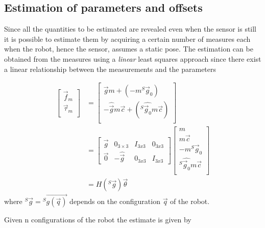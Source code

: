\subsection{Estimation of parameters and offsets}
Since all the quantities to be estimated are revealed even when the sensor is still
it is possible to estimate them by acquiring a certain number of measures each when
the robot, hence the sensor, assumes a static pose. The estimation can be obtained
from the measures using a \emph{linear} least squares approach since there exist
a linear relationship between the measurements and the parameters

\begin{equation*}
  \begin{flalign*}
    \begin{bmatrix}
      \vec{f}_{m} \\
      \vec{\tau}_{m} \\
    \end{bmatrix} &=
    \begin{bmatrix}
      \vec{g} m + (-m {}^S \vec{g}_{0}) \\
      -\hat{\vec{g}} m\vec{c} + ({}^S \hat{\vec{g}_{0}} m\vec{c}) \\
    \end{bmatrix}\\
    & =
    \begin{bmatrix}
      \vec{g} & 0_{3 \times 3} & I_{3x3} & 0_{3x3} \\
      \vec{0} & -\hat{\vec{g}} & 0_{3x3} & I_{3x3}
    \end{bmatrix}
    \begin{bmatrix}
      m \\
      m \vec{c} \\
      -m {}^S \vec{g}_{0} \\
      {}^S \hat{\vec{g}_{0}} m\vec{c} \\
    \end{bmatrix}\\
    &=
    H({}^S \vec{g}) \vec{\theta}
  \end{flalign*}
\end{equation*}
where ${}^S \vec{g} = {}^S \vec{g(\vec{q})}$ depends on the configuration $\vec{q}$ of the robot.
\par
Given n configurations of the robot the estimate is given by
